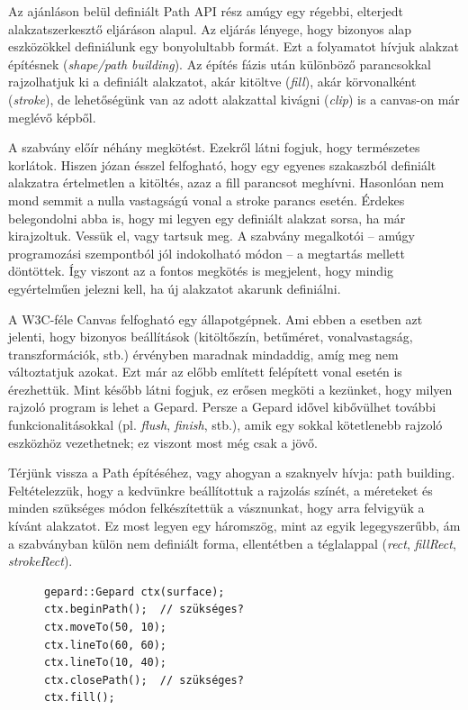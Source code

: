 \documentclass[12pt]{report}
\theoremstyle{definition}
\newcommand{\inenglish}[1]{\textsl{#1}}
\begin{document}
  Az ajánláson belül definiált Path API rész amúgy egy régebbi, elterjedt
alakzatszerkesztő eljáráson alapul. Az eljárás lényege, hogy bizonyos alap
eszközökkel definiálunk egy bonyolultabb formát. Ezt a folyamatot hívjuk
alakzat építésnek (\inenglish{shape/path building}). Az építés fázis után
különböző parancsokkal rajzolhatjuk ki a definiált alakzatot, akár kitöltve
(\emph{fill}), akár körvonalként (\emph{stroke}), de lehetőségünk van az adott
alakzattal kivágni (\emph{clip}) is a canvas-on már meglévő képből.

  A szabvány előír néhány megkötést. Ezekről látni fogjuk, hogy természetes
korlátok. Hiszen józan ésszel felfogható, hogy egy egyenes szakaszból definiált
alakzatra értelmetlen a kitöltés, azaz a fill parancsot meghívni. Hasonlóan nem
mond semmit a nulla vastagságú vonal a stroke parancs esetén. Érdekes
belegondolni abba is, hogy mi legyen egy definiált alakzat sorsa, ha már
kirajzoltuk. Vessük el, vagy tartsuk meg. A szabvány megalkotói -- amúgy
programozási szempontból jól indokolható módon -- a megtartás mellett
döntöttek. Így viszont az a fontos megkötés is megjelent, hogy mindig
egyértelműen jelezni kell, ha új alakzatot akarunk definiálni.

  A W3C-féle Canvas felfogható egy állapotgépnek. Ami ebben a esetben azt
jelenti, hogy bizonyos beállítások (kitöltőszín, betűméret, vonalvastagság,
transzformációk, stb.) érvényben maradnak mindaddig, amíg meg nem változtatjuk
azokat. Ezt már az előbb említett felépített vonal esetén is érezhettük. Mint
később látni fogjuk, ez erősen megköti a kezünket, hogy milyen rajzoló program
is lehet a Gepard. Persze a Gepard idővel kibővülhet további funkcionalitásokkal
(pl. \emph{flush}, \emph{finish}, stb.), amik egy sokkal kötetlenebb rajzoló
eszközhöz vezethetnek; ez viszont most még csak a jövő.

  Térjünk vissza a Path építéséhez, vagy ahogyan a szaknyelv hívja: path
building. Feltételezzük, hogy a kedvünkre beállítottuk a rajzolás
színét, a méreteket és minden szükséges módon felkészítettük a
vásznunkat, hogy arra felvigyük a kívánt alakzatot. Ez most legyen egy
háromszög, mint az egyik legegyszerűbb, ám a szabványban külön nem
definiált forma, ellentétben a téglalappal (\emph{rect}, \emph{fillRect},
\emph{strokeRect}).

\begin{figure}
\begin{lstlisting}
gepard::Gepard ctx(surface);
ctx.beginPath();  // szükséges?
ctx.moveTo(50, 10);
ctx.lineTo(60, 60);
ctx.lineTo(10, 40);
ctx.closePath();  // szükséges?
ctx.fill();
\end{lstlisting}
\end{figure}
\end{document}
